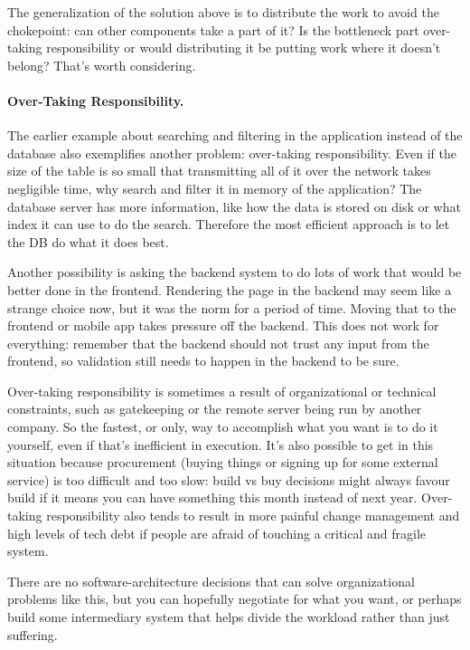 The generalization of the solution above is to distribute the work to avoid the chokepoint: can other components take a part of it? Is the bottleneck part over-taking responsibility or would distributing it be putting work where it doesn't belong? That's worth considering.

\paragraph{Over-Taking Responsibility.}
The earlier example about searching and filtering in the application instead of the database also exemplifies another problem: over-taking responsibility. Even if the size of the table is so small that transmitting all of it over the network takes negligible time, why search and filter it in memory of the application? The database server has more information, like how the data is stored on disk or what index it can use to do the search. Therefore the most efficient approach is to let the DB do what it does best.

Another possibility is asking the backend system to do lots of work that would be better done in the frontend. Rendering the page in the backend may seem like a strange choice now, but it was the norm for a period of time. Moving that to the frontend or mobile app takes pressure off the backend. This does not work for everything: remember that the backend should not trust any input from the frontend, so validation still needs to happen in the backend to be sure.

Over-taking responsibility is sometimes a result of organizational or technical constraints, such as gatekeeping or the remote server being run by another company. So the fastest, or only, way to accomplish what you want is to do it yourself, even if that's inefficient in execution. It's also possible to get in this situation because procurement (buying things or signing up for some external service) is too difficult and too slow: build vs buy decisions might always favour build if it means you can have something this month instead of next year. Over-taking responsibility also tends to result in more painful change management and high levels of tech debt if people are afraid of touching a critical and fragile system.

There are no software-architecture decisions that can solve organizational problems like this, but you can hopefully negotiate for what you want, or perhaps build some intermediary system that helps divide the workload rather than just suffering.



